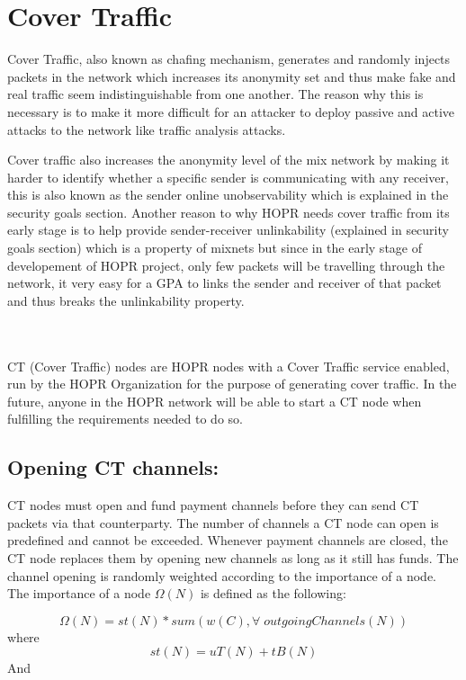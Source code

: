 \section{Cover Traffic}


Cover Traffic, also known as chafing mechanism, generates and randomly injects packets in the network which increases its anonymity set and thus make fake and real traffic seem indistinguishable from one another. The reason why this is necessary is to make it more difficult for an attacker to deploy passive and active attacks to the network like traffic analysis attacks.

Cover traffic also increases the anonymity level of the mix network by making it harder to identify whether a specific sender is communicating with any receiver, this is also known as the sender online unobservability which is explained in the security goals section.
Another reason to why HOPR needs cover traffic from its early stage is to help provide sender-receiver unlinkability (explained in security goals section) which is a property of mixnets but since in the early stage of developement of HOPR project, only few packets will be travelling through the network, it very easy for a GPA to links the sender and receiver of that packet and thus breaks the unlinkability property.

\\~\\ CT (Cover Traffic) nodes are HOPR nodes with a Cover Traffic service enabled, run by the HOPR Organization for the purpose of generating cover traffic. In the future, anyone in the HOPR network will be able to start a CT node when fulfilling the requirements needed to do so.
\subsection{Opening CT channels:} 
CT nodes must open and fund payment channels before they can send CT packets via that counterparty. The number of channels a CT node can open is predefined and cannot be exceeded. Whenever payment channels are closed, the CT node replaces them by opening new channels as long as it still has funds. 
The channel opening is randomly weighted according to the importance of a node. The importance of a node $\Omega(N)$ is defined as the following:

$$\Omega(N) = st(N) * sum(w(C), \forall \; outgoingChannels(N))$$
where 
$$st(N) = uT(N) + tB(N)$$
And 

